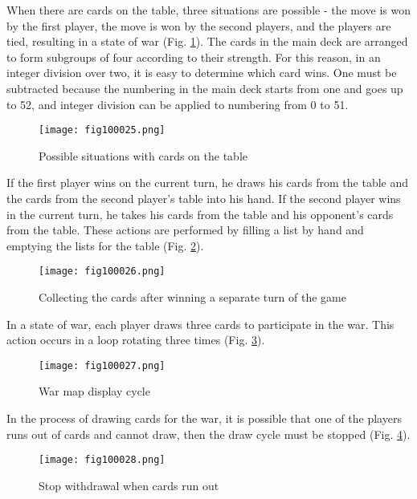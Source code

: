 When there are cards on the table, three situations are possible - the move is won by the first player, the move is won by the second players, and the players are tied, resulting in a state of war (Fig. \ref{fig100025}). The cards in the main deck are arranged to form subgroups of four according to their strength. For this reason, in an integer division over two, it is easy to determine which card wins. One must be subtracted because the numbering in the main deck starts from one and goes up to 52, and integer division can be applied to numbering from 0 to 51.

\begin{figure}[H]
   \centering
   \texttt{[image: fig100025.png]}
   \caption{Possible situations with cards on the table}
\label{fig100025}
\end{figure}

If the first player wins on the current turn, he draws his cards from the table and the cards from the second player's table into his hand. If the second player wins in the current turn, he takes his cards from the table and his opponent's cards from the table. These actions are performed by filling a list by hand and emptying the lists for the table (Fig. \ref{fig100026}).

\begin{figure}[H]
   \centering
   \texttt{[image: fig100026.png]}
   \caption{Collecting the cards after winning a separate turn of the game}
\label{fig100026}
\end{figure}

In a state of war, each player draws three cards to participate in the war. This action occurs in a loop rotating three times (Fig. \ref{fig100027}).

\begin{figure}[H]
   \centering
   \texttt{[image: fig100027.png]}
   \caption{War map display cycle}
\label{fig100027}
\end{figure}

In the process of drawing cards for the war, it is possible that one of the players runs out of cards and cannot draw, then the draw cycle must be stopped (Fig. \ref{fig100028}).

\begin{figure}[H]
   \centering
   \texttt{[image: fig100028.png]}
   \caption{Stop withdrawal when cards run out}
\label{fig100028}
\end{figure}

